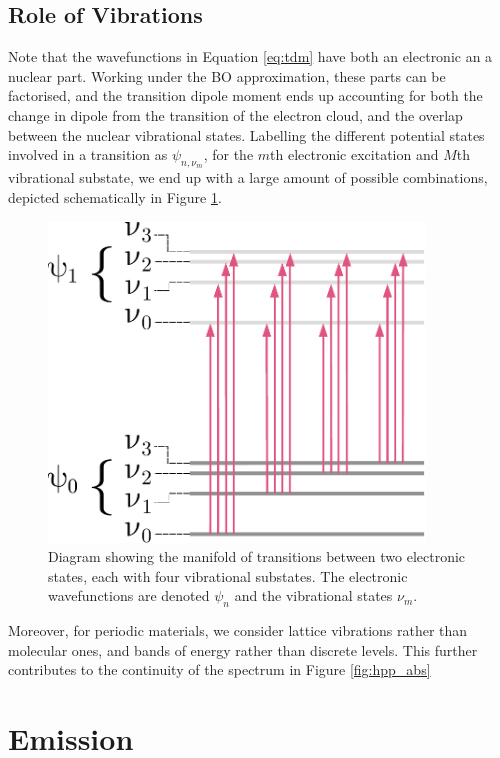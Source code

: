 \subsection{Role of Vibrations}

Note that the wavefunctions in Equation \ref{eq:tdm} have both an electronic an a nuclear part. Working under the BO approximation, these parts can be factorised, and the transition dipole moment ends up accounting for both the change in dipole from the transition of the electron cloud, and the overlap between the nuclear vibrational states. Labelling the different potential states involved in a transition as $\psi_{n,\nu_m}$, for the $m$th electronic excitation and $M$th vibrational substate, we end up with a large amount of possible combinations, depicted schematically in Figure \ref{fig:manifold}.

\begin{figure}
\centering
\includegraphics[width=10cm]{Chapters/4Photochem/jablo.pdf}
\caption{Diagram showing the manifold of transitions between two electronic states, each with four vibrational substates. The electronic wavefunctions are denoted $\psi_n$ and the vibrational states $\nu_m$.}
\label{fig:manifold}
\end{figure}

Moreover, for periodic materials, we consider lattice vibrations rather than molecular ones, and bands of energy rather than discrete levels. This further contributes to the continuity of the spectrum in Figure \ref{fig:hpp_abs}

\section{Emission}

